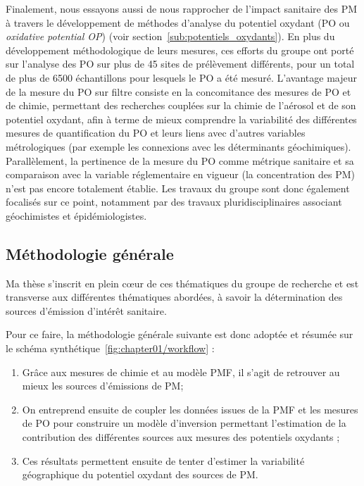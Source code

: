 Finalement, nous essayons aussi de nous rapprocher de l'impact sanitaire des PM à
travers le développement de méthodes d'analyse du potentiel oxydant (PO ou \textit{oxidative potential OP}) (voir
section~\ref{sub:potentiels_oxydants}). En plus du développement méthodologique de leurs
mesures, ces efforts du groupe ont porté sur l'analyse des PO sur plus de 45 sites de prélèvement différents, pour un
total de plus de 6500 échantillons pour lesquels le PO a été mesuré.
L'avantage majeur de la mesure du PO sur filtre consiste en la concomitance des mesures de
PO et de chimie, permettant des recherches couplées sur la chimie de l'aérosol et de son
potentiel oxydant, afin à terme de mieux comprendre la variabilité des différentes
mesures de quantification du PO et leurs liens avec d'autres variables métrologiques (par
exemple les connexions avec les déterminants géochimiques). Parallèlement, la pertinence de la
mesure du PO comme métrique sanitaire et sa comparaison avec la variable
réglementaire en vigueur (la concentration des PM) n'est pas encore totalement établie.
Les travaux du groupe sont donc également focalisés sur ce point, notamment par des travaux
pluridisciplinaires associant géochimistes et épidémiologistes.

\subsection{Méthodologie générale}%
\label{sub:méthodologie_general}

Ma thèse s'inscrit en plein cœur de ces thématiques du groupe de recherche et est transverse aux
différentes thématiques abordées, à savoir la détermination des sources d'émission d'intérêt
sanitaire.

Pour ce faire, la méthodologie générale suivante est donc adoptée et résumée sur le schéma
synthétique~\ref{fig:chapter01/workflow} :

\begin{enumerate}
    \item Grâce aux mesures de chimie et au modèle PMF, il s'agit de retrouver au mieux les
        sources d'émissions de PM;
    \item On entreprend ensuite de coupler les données issues de la PMF et les mesures de PO pour construire un
        modèle d'inversion permettant l'estimation de la contribution des différentes
        sources aux mesures des potentiels oxydants ;
    \item Ces résultats permettent ensuite de tenter d'estimer la variabilité géographique du potentiel oxydant des sources de PM.
\end{enumerate}

